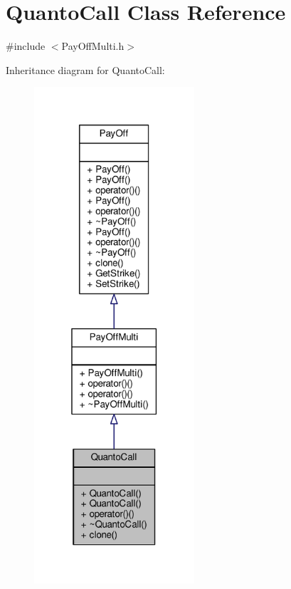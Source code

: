 \hypertarget{classQuantoCall}{}\section{Quanto\+Call Class Reference}
\label{classQuantoCall}


{\ttfamily \#include $<$Pay\+Off\+Multi.\+h$>$}



Inheritance diagram for Quanto\+Call\+:
\nopagebreak
\begin{figure}[H]
\begin{center}
\leavevmode
\includegraphics[width=169pt]{classQuantoCall__inherit__graph}
\end{center}
\end{figure}


